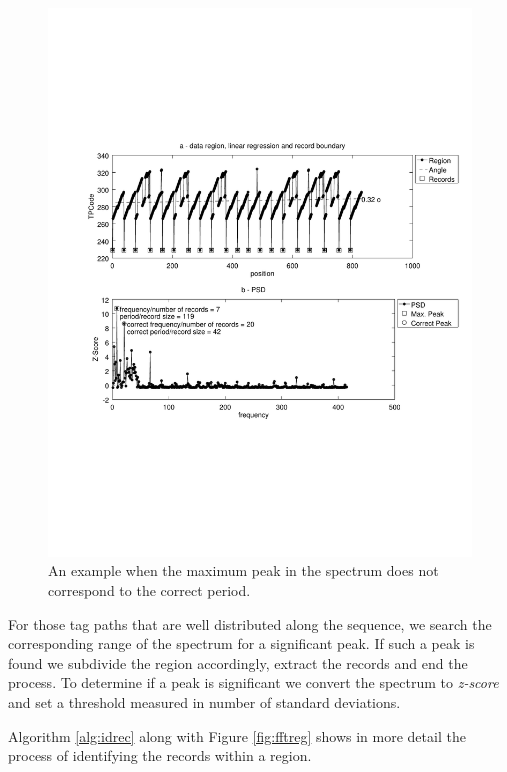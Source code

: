 \documentclass{vldb}
\begin{document}
\begin{figure}[h]
  \centering
     \includegraphics[trim={2.5cm 7.5cm 1cm 6.5cm}, width=\linewidth
     ]{img/fftleak.pdf}
  \caption{An example when the maximum peak in the spectrum does not correspond to the correct period.}
  \label{fig:fftleak}
\end{figure}

For those tag paths that are well distributed along the sequence, we search the
corresponding range of the spectrum for a significant peak. If such a peak is
found we subdivide the region accordingly, extract the records and end the
process. To determine if a peak is significant we convert the spectrum to
\textit{z-score} and set a threshold measured in number of standard deviations.

Algorithm \ref{alg:idrec} along with Figure \ref{fig:fftreg} shows in more
detail the process of identifying the records within a region.
\end{document}
